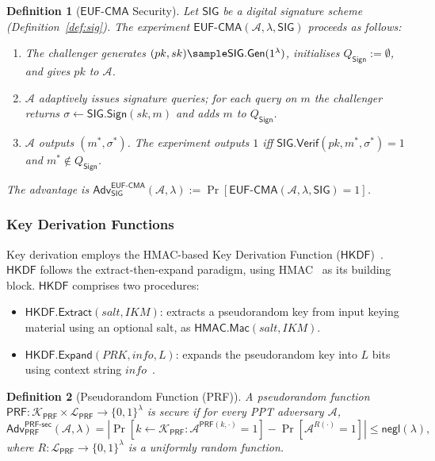 \documentclass[runningheads]{llncs}
\newtheorem{defn}{Definition}[]
\newcommand{\negli}{\mathsf{negl}}
\newcommand{\verif}{\mathsf{Verif}}
\newcommand{\hkdf}{\mathsf{HKDF}}
\newcommand{\extr}{\mathsf{Extract}}
\newcommand{\expand}{\mathsf{Expand}}
\newcommand{\hmac}{\mathsf{HMAC}}
\begin{document}
\begin{defn}[$\mathsf{EUF}\text{-}\mathsf{CMA}$ Security] \label{def:euf-cma}
Let $\mathsf{SIG}$ be a digital signature scheme (Definition~\ref{def:sig}). The experiment $\mathsf{EUF}\text{-}\mathsf{CMA}(\mathcal{A}, \lambda, \mathsf{SIG})$ proceeds as follows:
\begin{enumerate}
    \item The challenger generates $(pk, sk) \sample \mathsf{SIG.Gen}(1^{\lambda})$, initialises $Q_{\mathsf{Sign}} := \emptyset$, and gives $pk$ to $\mathcal{A}$.
    \item $\mathcal{A}$ adaptively issues signature queries; for each query on $m$ the challenger returns $\sigma \gets \mathsf{SIG.Sign}(sk, m)$ and adds $m$ to $Q_{\mathsf{Sign}}$.
    \item $\mathcal{A}$ outputs $(m^*, \sigma^*)$. The experiment outputs $1$ iff $\mathsf{SIG.\verif}(pk, m^*, \sigma^*) = 1$ and $m^* \not\in Q_{\mathsf{Sign}}$.
\end{enumerate}
The advantage is $\mathsf{Adv}_{\mathsf{SIG}}^{\mathsf{EUF}\text{-}\mathsf{CMA}}(\mathcal{A}, \lambda) := \Pr[ \mathsf{EUF}\text{-}\mathsf{CMA}(\mathcal{A}, \lambda, \mathsf{SIG}) = 1 ]$.
\end{defn}

\subsubsection{Key Derivation Functions}
{\sloppy
Key derivation employs the HMAC-\allowbreak based Key Derivation Function ($\hkdf$)~\cite{RFC5869}.
$\hkdf$ follows the extract-\allowbreak then-\allowbreak expand paradigm, using HMAC~\cite{DBLP:journals/rfc/rfc2104} as its building block.
$\hkdf$ comprises two procedures:
\par}
\begin{itemize}
    \item $\hkdf.\extr(\mathit{salt},\mathit{IKM})$: extracts a pseudorandom key from input keying material using an optional salt, as $\hmac.\mathsf{Mac}(\mathit{salt},\mathit{IKM})$.
    \item $\hkdf.\expand(\mathit{PRK},\mathit{info},L)$: expands the pseudorandom key into $L$ bits using context string $\mathit{info}$~\cite{JC:DFGS21}.
\end{itemize}

\begin{defn}[Pseudorandom Function (PRF)] \label{def:prf}
A pseudorandom function $\mathsf{PRF}: \mathcal{K}_{\mathsf{PRF}} \times \mathcal{L}_{\mathsf{PRF}} \to \{0,1\}^\lambda$ is secure if for every PPT adversary $\mathcal{A}$,
\[
\mathsf{Adv}_{\mathsf{PRF}}^{\mathsf{PRF}\text{-}\mathsf{sec}}(\mathcal{A}, \lambda) = \left| \Pr\left[ k \gets \mathcal{K}_{\mathsf{PRF}} : \mathcal{A}^{\mathsf{PRF}(k,\cdot)} = 1 \right] - \Pr\left[ \mathcal{A}^{R(\cdot)} = 1 \right] \right| \leq \negli(\lambda),
\]
where $R: \mathcal{L}_{\mathsf{PRF}} \to \{0,1\}^\lambda$ is a uniformly random function.
\end{defn}
\end{document}
